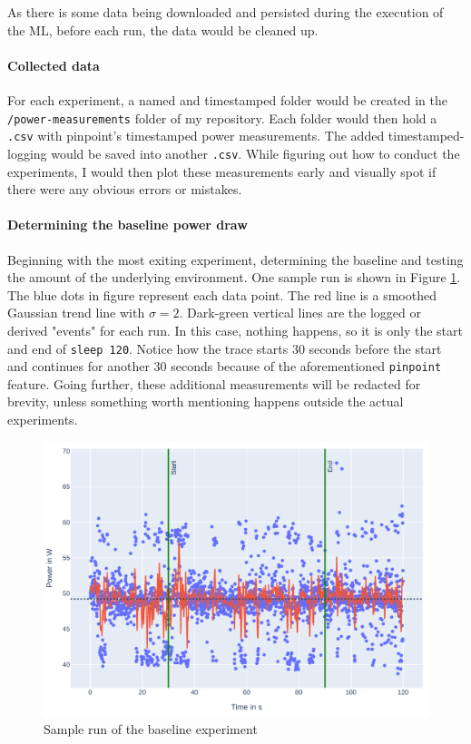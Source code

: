 As there is some data being downloaded and persisted during the execution of the ML, before each run, the data would be cleaned up.

\paragraph{Collected data}

For each experiment, a named and timestamped folder would be created in the \verb|/power-measurements| folder of my repository. Each folder would then hold a \verb|.csv| with pinpoint's timestamped power measurements. 
The added timestamped-logging would be saved into another \verb|.csv|. 
While figuring out how to conduct the experiments, I would then plot these measurements early and visually spot if there were any obvious errors or mistakes.

\paragraph{Determining the baseline power draw}

Beginning with the most exiting experiment, determining the baseline and testing the amount of the underlying environment. 
One sample run is shown in Figure \ref{fig:plot_baseline}.
The blue dots in figure represent each data point. The red line is a smoothed Gaussian trend line with $\sigma = 2$. 
Dark-green vertical lines are the logged or derived "events" for each run. In this case, nothing happens, so it is only the start and end of \verb|sleep 120|. 
Notice how the trace starts 30 seconds before the start and continues for another 30 seconds because of the aforementioned \verb|pinpoint| feature.
Going further, these additional measurements will be redacted for brevity, unless something worth mentioning happens outside the actual experiments.

\begin{figure}
    \includegraphics[width=\linewidth]{power-measurements/measurements_sleep_0714004033/plot.pdf}
    \caption{Sample run of the baseline experiment}
    \label{fig:plot_baseline}
\end{figure}

